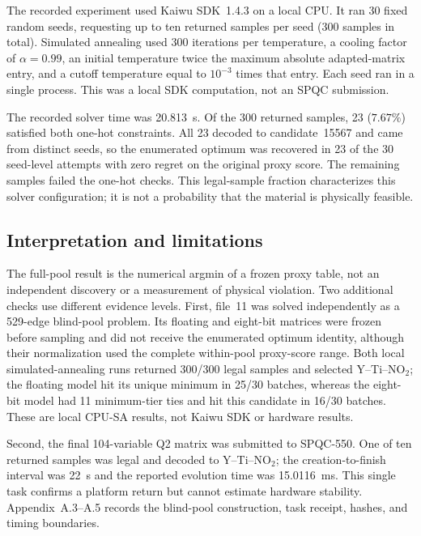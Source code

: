 The recorded experiment used Kaiwu SDK~1.4.3 on a local CPU.  It ran
30 fixed random seeds, requesting up to ten returned samples per seed
(300 samples in total).  Simulated annealing used 300 iterations per
temperature, a cooling factor of $\alpha=0.99$, an initial temperature
twice the maximum absolute adapted-matrix entry, and a cutoff temperature
equal to $10^{-3}$ times that entry.  Each seed ran in a single process.
This was a local SDK computation, not an SPQC submission.

The recorded solver time was 20.813~s.  Of the 300 returned samples, 23
($7.67\%$) satisfied both one-hot constraints.  All 23 decoded to
candidate~15567 and came from distinct seeds, so the enumerated optimum
was recovered in 23 of the 30 seed-level attempts with zero regret on the
original proxy score.  The remaining samples failed the one-hot checks.
This legal-sample fraction characterizes this solver configuration; it is
not a probability that the material is physically feasible.

\subsection{Interpretation and limitations}

The full-pool result is the numerical argmin of a frozen proxy table, not
an independent discovery or a measurement of physical violation.  Two
additional checks use different evidence levels.  First, file~11 was solved
independently as a 529-edge blind-pool problem.  Its floating and eight-bit
matrices were frozen before sampling and did not receive the enumerated
optimum identity, although their normalization used the complete within-pool
proxy-score range.  Both local simulated-annealing runs returned 300/300
legal samples and selected Y--Ti--$\mathrm{NO}_2$; the floating model hit
its unique minimum in 25/30 batches, whereas the eight-bit model had 11
minimum-tier ties and hit this candidate in 16/30 batches.  These are local
CPU-SA results, not Kaiwu SDK or hardware results.

Second, the final 104-variable Q2 matrix was submitted to SPQC-550.  One of
ten returned samples was legal and decoded to Y--Ti--$\mathrm{NO}_2$; the
creation-to-finish interval was 22~s and the reported evolution time was
15.0116~ms.  This single task confirms a platform return but cannot estimate
hardware stability.  Appendix~A.3--A.5 records the blind-pool construction,
task receipt, hashes, and timing boundaries.
